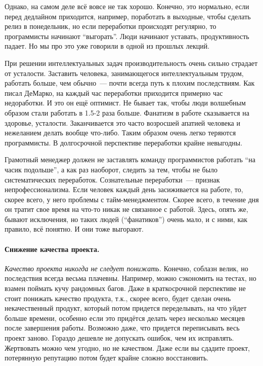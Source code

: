 \documentclass{../../text-style}
\begin{document}
Однако, на самом деле всё вовсе не так хорошо. Конечно, это нормально, если перед дедлайном приходится, например, поработать в выходные, чтобы сделать релиз в понедельник, но если переработки происходят регулярно, то программисты начинают \enquote{выгорать}. Люди начинают уставать, продуктивность падает. Но мы про это уже говорили в одной из прошлых лекций.

При решении интеллектуальных задач производительность очень сильно страдает от усталости. Заставить человека, занимающегося интеллектуальным трудом, работать больше, чем обычно~--- почти всегда путь к плохим последствиям. Как писал ДеМарко, на каждый час переработки приходится примерно час недоработки. И это он ещё оптимист. Не бывает так, чтобы люди волшебным образом стали работать в 1.5-2 раза больше. Фанатизм в работе сказывается на здоровье, усталости. Заканчивается это часто возросшей апатией человека и нежеланием делать вообще что-либо. Таким образом очень легко теряются программисты. В долгосрочной перспективе переработки крайне невыгодны.

Грамотный менеджер должен не заставлять команду программистов работать \enquote{на часик подольше}, а как раз наоборот, следить за тем, чтобы не было систематических переработок. Сознательные переработки~--- признак непрофессионализма. Если человек каждый день засиживается на работе, то, скорее всего, у него проблемы с тайм-менеджментом. Скорее всего, в течение дня он тратит свое время на что-то никак не связанное с работой. Здесь, опять же, бывают исключения, но таких людей (\enquote{фанатиков}) очень мало, и с ними, как правило, всё понятно. И они тоже выгорают.

\paragraph{Снижение качества проекта.} \emph{Качество проекта никогда не следует понижать.} Конечно, соблазн велик, но последствия всегда весьма плачевны. Например, можно сэкономить на тестах, но взамен поймать кучу рандомных багов. Даже в краткосрочной перспективе не стоит понижать качество продукта, т.к., скорее всего, будет сделан очень некачественный продукт, который потом придется переделывать, на что уйдет больше времени, особенно если это придётся делать через несколько месяцев после завершения работы. Возможно даже, что придется переписывать весь проект заново. Гораздо дешевле не допускать ошибок, чем их исправлять. Жертвовать можно чем угодно, но не качеством. Даже если вы сдадите проект, потерянную репутацию потом будет крайне сложно восстановить.
\end{document}
